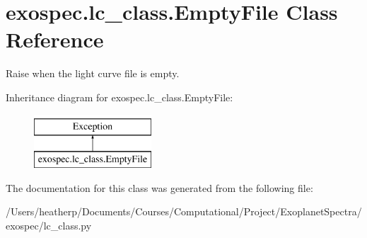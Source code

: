 \hypertarget{classexospec_1_1lc__class_1_1_empty_file}{}\section{exospec.\+lc\+\_\+class.\+Empty\+File Class Reference}
\label{classexospec_1_1lc__class_1_1_empty_file}


Raise when the light curve file is empty.  


Inheritance diagram for exospec.\+lc\+\_\+class.\+Empty\+File\+:\begin{figure}[H]
\begin{center}
\leavevmode
\includegraphics[height=2.000000cm]{classexospec_1_1lc__class_1_1_empty_file}
\end{center}
\end{figure}


The documentation for this class was generated from the following file\+:\begin{DoxyCompactItemize}
\item 
/\+Users/heatherp/\+Documents/\+Courses/\+Computational/\+Project/\+Exoplanet\+Spectra/exospec/lc\+\_\+class.\+py\end{DoxyCompactItemize}
